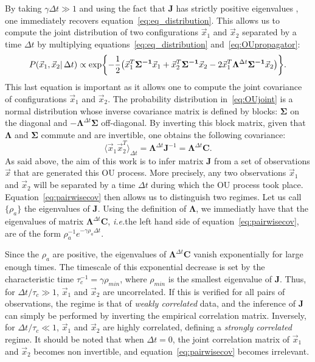 \documentclass[preprint,amsmath,amssymb,superscriptaddress,showpacs,pre]{revtex4-1}
\let\originalleft\left
\let\originalright\right
\renewcommand{\left}{\mathopen{}\mathclose\bgroup\originalleft}
\renewcommand{\right}{\aftergroup\egroup\originalright}
\newcommand{\ie}{\emph{i.e.}}
\def\vx{\vec x}
\newcommand{\Lam}{\bm{\Lambda}}
\newcommand{\Sig}{\bm{\Sigma}}
\newcommand{\curlynormalpar}[1]{\exp\left\{-\frac{1}{2}\left( #1 \right)\right\}}
\newcommand{\iSig}{\bm{\Sigma^{-1}}}
\begin{document}
By taking $\gamma\Delta t \gg 1$ and using the fact that $\bm{J}$ has strictly positive eigenvalues , one immediately recovers equation~\ref{eq:eq_distribution}. 
This allows us to compute the joint distribution of two configurations $\vx_1$ and $\vx_2$ separated by a time $\Delta t$ by multiplying equations~\ref{eq:eq_distribution} and~\ref{eq:OUpropagator}: 
\begin{equation}
	P(\vx_1, \vx_2\vert\,\Delta t) \propto \curlynormalpar{\vx_1^T\iSig\vx_1 + \vx_2^T\iSig\vx_2 - 2\vx_1^T\Lam^{\Delta t}\iSig\vx_2}. 
	\label{eq:OUjoint}	
\end{equation}
This last equation is important as it allows one to compute the joint covariance of configurations $\vx_1$ and $\vx_2$. 
The probability distribution in~\ref{eq:OUjoint} is a normal distribution whose inverse covariance matrix is defined by blocks: $\Sig$ on the diagonal and $-\Lam^{\Delta t}\Sig$ off-diagonal. 
By inverting this block matrix, given that $\Lam$ and $\Sig$ commute and are invertible, one obtains the following covariance: 
\begin{equation}
	\langle \vx_1\vx_2^T \rangle_{\Delta t} = \Lam^{\Delta t}\bm{J}^{-1} = \Lam^{\Delta t}\bm{C}. 
	\label{eq:pairwisecov}
\end{equation}
As said above, the aim of this work is to infer matrix $\bm{J}$ from a set of observations $\vx$ that are generated this OU process. 
More precisely, any two observations $\vx_1$ and $\vx_2$ will be separated by a time $\Delta t$ during which the OU process took place. 
Equation~\ref{eq:pairwisecov} then allows us to distinguish two regimes. 
Let us call $\{\rho_a\}$ the eigenvalues of $\bm{J}$. 
Using the definition of $\Lam$, we immediatly have that the eigenvalues of matrix $\Lam^{\Delta t}\bm{C}$, \ie  the left hand side of equation~\ref{eq:pairwisecov}, are of the form $\rho_a^{-1}e^{-\gamma\rho_a\Delta t}$.

Since the $\rho_a$ are positive, the eigenvalues of $\Lam^{\Delta t}\bm{C}$ vanish exponentially for large enough times. 
The timescale of this exponential decrease is set by the characteristic time $\tau_c^{-1} = \gamma\rho_{min}$, where $\rho_{min}$ is the smallest eigenvalue of $\bm{J}$. 
Thus, for $\Delta t / \tau_c \gg 1$, $\vx_1$ and $\vx_2$ are uncorrelated. 
If this is verified for all pairs of observations, the regime is that of \emph{weakly correlated} data, and the inference of $\bm{J}$ can simply be performed by inverting the empirical correlation matrix. 
Inversely, for $\Delta t / \tau_c \ll 1$, $\vx_1$ and $\vx_2$ are highly correlated, defining a \emph{strongly correlated} regime. 
It should be noted that when $\Delta t = 0$, the joint correlation matrix of $\vx_1$ and $\vx_2$ becomes non invertible, and equation~\ref{eq:pairwisecov} becomes irrelevant. 
\end{document}
